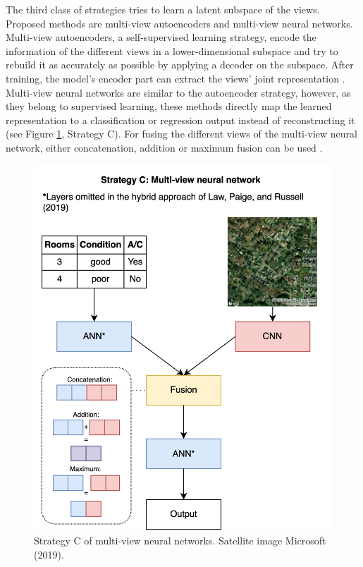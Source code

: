 \documentclass[letterpaper]{article}
\begin{document}
The third class of strategies tries to learn a latent subspace of the views. Proposed methods are multi-view autoencoders and multi-view neural networks. Multi-view autoencoders, a self-supervised learning strategy, encode the information of the different views in a lower-dimensional subspace and try to rebuild it as accurately as possible by applying a decoder on the subspace. After training, the model's encoder part can extract the views' joint representation \cite{li2018survey}. Multi-view neural networks are similar to the autoencoder strategy, however, as they belong to supervised learning, these methods directly map the learned representation to a classification or regression output instead of reconstructing it \cite{xu2013survey} (see Figure \ref{strategyC}, Strategy C). For fusing the different views of the multi-view neural network, either concatenation, addition or maximum fusion can be used \cite{li2018survey}.

\begin{figure}[t]
\centering
\includegraphics[width=0.9\columnwidth]{StrategyC.png} %
\caption{Strategy C of multi-view neural networks. Satellite image \textcopyright \space Microsoft (2019).}
\label{strategyC}
\end{figure}
\end{document}
